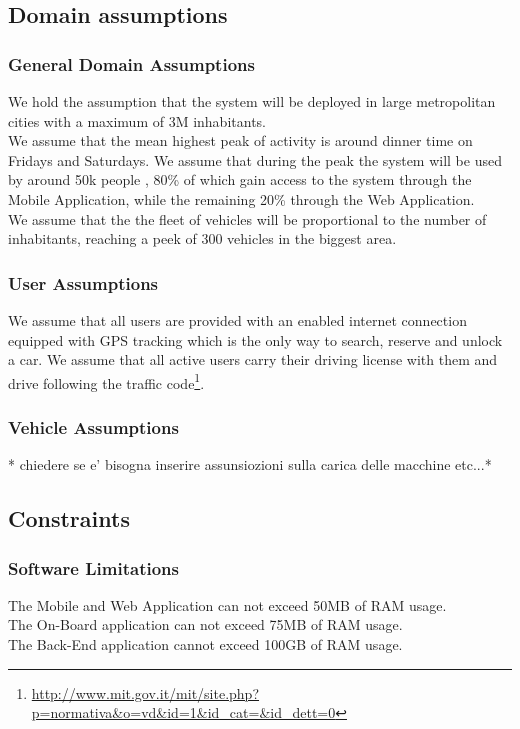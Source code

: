 \documentclass[12pt]{article}
\begin{document}
	
	\subsection{Domain assumptions}
		\subsubsection{General Domain Assumptions}
			We hold the assumption that the system will be deployed in large metropolitan cities with a maximum of 3M inhabitants.\\
			We assume that the mean highest peak of activity is around dinner time on Fridays and Saturdays. We assume that during the peak the system will be used by around 50k people , 80\% of which gain access to the system through the Mobile Application, while the remaining 20\% through the Web Application.\\
			We assume that the the fleet of vehicles will be proportional to the number of inhabitants, reaching a peek of 300 vehicles in the biggest area.\\
		\subsubsection{User Assumptions}
		We assume that all users are provided with an enabled internet connection equipped with GPS tracking which is the only way to search, reserve and unlock a car.
		We assume that all active users carry their driving license with them and drive following the traffic code\footnote{\url {http://www.mit.gov.it/mit/site.php?p=normativa&o=vd&id=1&id_cat=&id_dett=0}}.
		\subsubsection{Vehicle Assumptions}
		* chiedere se e' bisogna inserire assunsiozioni sulla carica delle macchine etc...*		
			
	\subsection{Constraints}
	
	\subsubsection{Software Limitations}
	The Mobile and Web Application can not exceed 50MB of RAM usage.\\
	The On-Board application can not exceed 75MB of RAM usage.\\
	The Back-End application cannot exceed 100GB of RAM usage.
	\newpage
\end{document}
